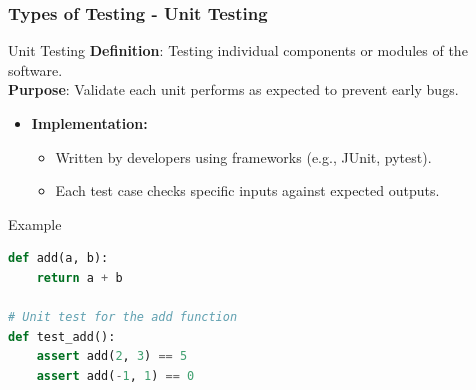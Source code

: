 \documentclass{beamer}
\begin{document}
\begin{frame}[fragile]
    \frametitle{Types of Testing - Unit Testing}
    \begin{block}{Unit Testing}
        \textbf{Definition}: Testing individual components or modules of the software. \\
        \textbf{Purpose}: Validate each unit performs as expected to prevent early bugs. 
    \end{block}
    \begin{itemize}
        \item \textbf{Implementation:}
            \begin{itemize}
                \item Written by developers using frameworks (e.g., JUnit, pytest).
                \item Each test case checks specific inputs against expected outputs.
            \end{itemize}
    \end{itemize}
    \begin{block}{Example}
        \begin{lstlisting}[language=Python]
def add(a, b):
    return a + b

# Unit test for the add function
def test_add():
    assert add(2, 3) == 5
    assert add(-1, 1) == 0
        \end{lstlisting}
    \end{block}
\end{frame}
\end{document}
